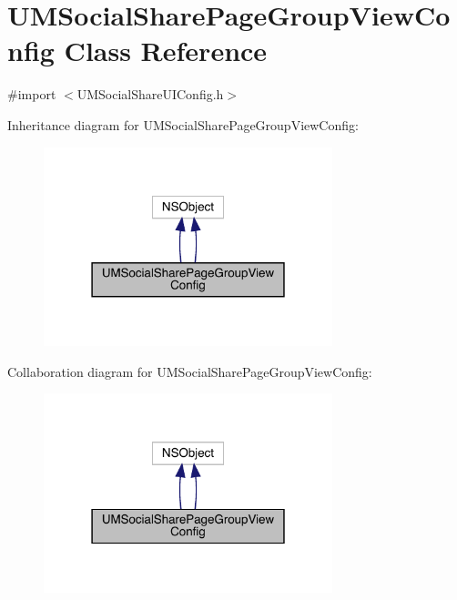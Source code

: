 \hypertarget{interface_u_m_social_share_page_group_view_config}{}\section{U\+M\+Social\+Share\+Page\+Group\+View\+Config Class Reference}
\label{interface_u_m_social_share_page_group_view_config}


{\ttfamily \#import $<$U\+M\+Social\+Share\+U\+I\+Config.\+h$>$}



Inheritance diagram for U\+M\+Social\+Share\+Page\+Group\+View\+Config\+:\nopagebreak
\begin{figure}[H]
\begin{center}
\leavevmode
\includegraphics[width=238pt]{interface_u_m_social_share_page_group_view_config__inherit__graph}
\end{center}
\end{figure}


Collaboration diagram for U\+M\+Social\+Share\+Page\+Group\+View\+Config\+:\nopagebreak
\begin{figure}[H]
\begin{center}
\leavevmode
\includegraphics[width=238pt]{interface_u_m_social_share_page_group_view_config__coll__graph}
\end{center}
\end{figure}
